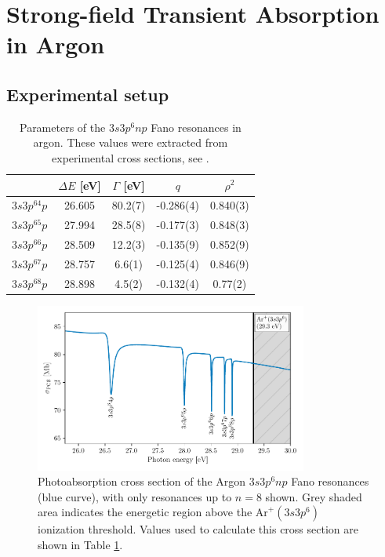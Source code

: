 \section{Strong-field Transient Absorption in Argon}
\label{sec:ATS_ar}

\subsection{Experimental setup}
\label{sec:ATS_ar_exp_setup}


\begin{table}[]
	\centering
	\begin{tabular}{lcccc}
		\hline\hline
		\multicolumn{1}{c}{} & $\Delta E$ [eV]   & $\Gamma$ [eV]   & $q$         & $\rho^2$     \\ \hline
		$3s3p^64p$              & 26.605 & 80.2(7) & -0.286(4) & 0.840(3) \\
		$3s3p^65p$              & 27.994 & 28.5(8) & -0.177(3) & 0.848(3) \\
		$3s3p^66p$              & 28.509 & 12.2(3) & -0.135(9) & 0.852(9) \\
		$3s3p^67p$              & 28.757 & 6.6(1)  & -0.125(4) & 0.846(9) \\
		$3s3p^68p$              & 28.898 & 4.5(2)  & -0.132(4) & 0.77(2)  \\ \hline\hline
	\end{tabular}
	\caption{Parameters of the $3s3p^6np$ Fano resonances in argon. These values were extracted from experimental cross sections, see \cite{caretteMulticonfigurationalHartreeFockClosecoupling2013, wuElectronimpactStudyValence1995, berrahAngulardistributionParametersAndRmatrix1996}.}
	\label{table:fano_params}
\end{table}

\begin{figure}
	\centering
	\includegraphics[width=0.8\textwidth]{figures/ATS/fano_GS.pdf}
	\caption{Photoabsorption cross section of the Argon $3s3p^6np$ Fano resonances (blue curve), with only resonances up to $n=8$ shown.  Grey shaded area indicates the energetic region above the $\mathrm{Ar}^+(3s3p^6)$ ionization threshold. Values used to calculate this cross section are shown in Table \ref{table:fano_params}.}
	\label{fig:fano_gs_pcs}
\end{figure}

